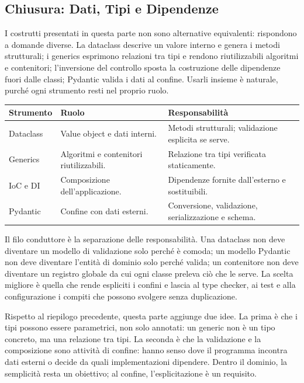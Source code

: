 \documentclass[12pt]{extarticle}
\begin{document}
\subsection{Chiusura: Dati, Tipi e Dipendenze}

\noindent I costrutti presentati in questa parte non sono alternative equivalenti: rispondono a domande diverse. La dataclass descrive un valore interno e genera i metodi strutturali; i generics esprimono relazioni tra tipi e rendono riutilizzabili algoritmi e contenitori; l'inversione del controllo sposta la costruzione delle dipendenze fuori dalle classi; Pydantic valida i dati al confine. Usarli insieme è naturale, purché ogni strumento resti nel proprio ruolo.

\begin{center}
\small
\begin{tabular}{p{3.6cm}p{5.4cm}p{6.4cm}}
    \toprule
    \textbf{Strumento} & \textbf{Ruolo} & \textbf{Responsabilità} \\
    \midrule
    Dataclass & Value object e dati interni. & Metodi strutturali; validazione esplicita se serve. \\
    \addlinespace
    Generics & Algoritmi e contenitori riutilizzabili. & Relazione tra tipi verificata staticamente. \\
    \addlinespace
    IoC e DI & Composizione dell'applicazione. & Dipendenze fornite dall'esterno e sostituibili. \\
    \addlinespace
    Pydantic & Confine con dati esterni. & Conversione, validazione, serializzazione e schema. \\
    \bottomrule
\end{tabular}
\end{center}

\noindent Il filo conduttore è la separazione delle responsabilità. Una dataclass non deve diventare un modello di validazione solo perché è comoda; un modello Pydantic non deve diventare l'entità di dominio solo perché valida; un contenitore non deve diventare un registro globale da cui ogni classe preleva ciò che le serve. La scelta migliore è quella che rende espliciti i confini e lascia al type checker, ai test e alla configurazione i compiti che possono svolgere senza duplicazione.

\noindent Rispetto al riepilogo precedente, questa parte aggiunge due idee. La prima è che i tipi possono essere parametrici, non solo annotati: un generic non è un tipo concreto, ma una relazione tra tipi. La seconda è che la validazione e la composizione sono attività di confine: hanno senso dove il programma incontra dati esterni o decide da quali implementazioni dipendere. Dentro il dominio, la semplicità resta un obiettivo; al confine, l'esplicitazione è un requisito.
\end{document}
